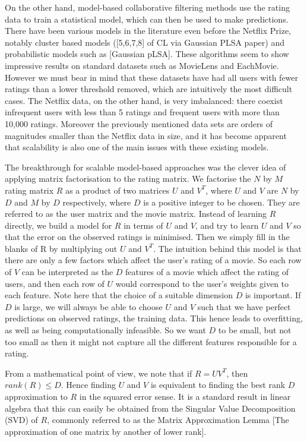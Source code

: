 \documentclass{article}
\theoremstyle{plain}
\begin{document}
On the other hand, model-based collaborative filtering methods use the rating data to train a statistical model, which can then be used to make predictions. There have been various models in the literature even before the Netflix Prize, notably cluster based models ([5,6,7,8] of CL via Gaussian PLSA paper) and probabilistic models such as [Gaussian pLSA]. These algorithms seem to show impressive results on standard datasets such as MovieLens and EachMovie. However we must bear in mind that these datasets have had all users with fewer ratings than a lower threshold removed, which are intuitively the most difficult cases. The Netflix data, on the other hand, is very imbalanced: there coexist infrequent users with less than 5 ratings and frequent users with more than 10,000 ratings. Moreover the previously mentioned data sets are orders of magnitudes smaller than the Netflix data in size, and it has become apparent that scalability is also one of the main issues with these existing models.

The breakthrough for scalable model-based approaches was the clever idea of applying matrix factorisation to the rating matrix. We factorise the $N$ by $M$ rating matrix $R$ as a product of two matrices $U$ and $V^T$, where $U$ and $V$ are $N$ by $D$ and $M$ by $D$ respectively, where $D$ is a positive integer to be chosen. They are referred to as the user matrix and the movie matrix. Instead of learning $R$ directly, we build a model for $R$ in terms of $U$ and $V$, and try to learn $U$ and $V$ so that the error on the observed ratings is minimised. Then we simply fill in the blanks of R by multiplying out $U$ and $V^T$. The intuition behind this model is that there are only a few factors which affect the user's rating of a movie. So each row of $V$ can be interpreted as the $D$ features of a movie which affect the rating of users, and then each row of $U$ would correspond to the user's weights given to each feature. Note here that the choice of a suitable dimension $D$ is important. If $D$ is large, we will always be able to choose $U$ and $V$ such that we have perfect predictions on observed ratings, the training data. This hence leads to overfitting, as well as being computationally infeasible. So we want $D$ to be small, but not too small as then it might not capture all the different features responsible for a rating.

From a mathematical point of view, we note that if $R=UV^T$, then $rank(R)\leq D$. Hence finding $U$ and $V$ is equivalent to finding the best rank $D$ approximation to $R$ in the squared error sense. It is a standard result in linear algebra that this can easily be obtained from the Singular Value Decomposition (SVD) of $R$, commonly referred to as the Matrix Approximation Lemma [The approximation of one matrix by another of lower rank].
\end{document}
